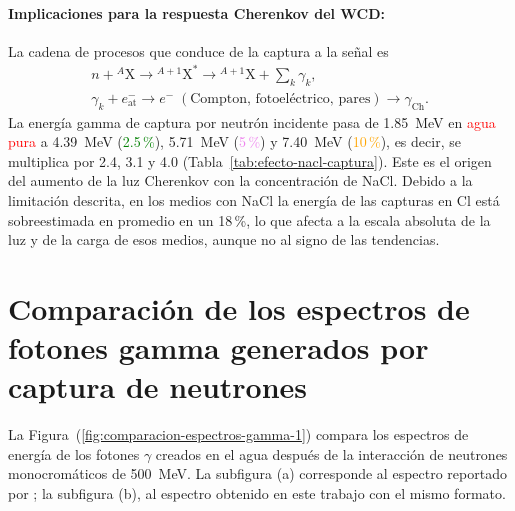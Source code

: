 \paragraph{Implicaciones para la respuesta Cherenkov del WCD:} La cadena de procesos que conduce de la captura a la señal es
\begin{gather}
	n + {}^{A}\mathrm{X} \longrightarrow {}^{A+1}\mathrm{X}^{*} \longrightarrow {}^{A+1}\mathrm{X} + \sum_{k}\gamma_{k}, \\
	\gamma_{k} + e^{-}_{\mathrm{at}} \longrightarrow e^{-} \;(\text{Compton, fotoeléctrico, pares}) \longrightarrow \gamma_{\mathrm{Ch}} .
\end{gather}
La energía gamma de captura por neutrón incidente pasa de 1.85~MeV en \textcolor{red}{agua pura} a 4.39~MeV (\textcolor{green}{2.5\,\%}), 5.71~MeV (\textcolor{violet}{5\,\%}) y 7.40~MeV (\textcolor{orange}{10\,\%}), es decir, se multiplica por 2.4, 3.1 y 4.0 (Tabla~\ref{tab:efecto-nacl-captura}). Este es el origen del aumento de la luz Cherenkov con la concentración de NaCl. Debido a la limitación descrita, en los medios con NaCl la energía de las capturas en Cl está sobreestimada en promedio en un 18\,\%, lo que afecta a la escala absoluta de la luz y de la carga de esos medios, aunque no al signo de las tendencias.

\section{Comparación de los espectros de fotones gamma generados por captura de neutrones}
\label{subsubsec:espectros-gamma}

\noindent La Figura~(\ref{fig:comparacion-espectros-gamma-1}) compara los espectros de energía de los fotones $\gamma$ creados en el agua después de la interacción de neutrones monocromáticos de 500~MeV. La subfigura (a) corresponde al espectro reportado por \citet[Fig.~3, pp.~2219--2220]{Sidelnik2020}; la subfigura (b), al espectro obtenido en este trabajo con el mismo formato.

